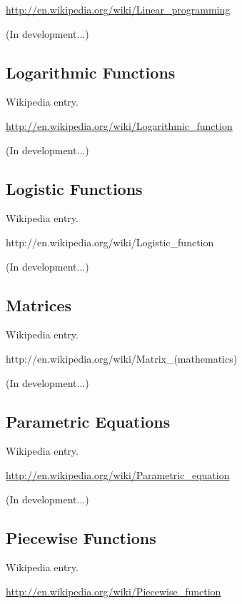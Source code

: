 \documentclass[12pt,twoside]{book}
\begin{document}
\href{http://en.wikipedia.org/wiki/Linear_programming}{http://en.wikipedia.org/wiki/Linear\_programming}

(In development...)

\subsection[Logarithmic Functions]{Logarithmic Functions}

Wikipedia entry.

\href{http://en.wikipedia.org/wiki/Logarithmic_function}{http://en.wikipedia.org/wiki/Logarithmic\_function}

(In development...)

\subsection[Logistic Functions]{Logistic Functions}

Wikipedia entry.

http://en.wikipedia.org/wiki/Logistic\_function

(In development...)

\subsection[Matrices]{Matrices}

Wikipedia entry.

http://en.wikipedia.org/wiki/Matrix\_(mathematics)

(In development...)

\subsection[Parametric Equations]{Parametric Equations}

Wikipedia entry.

\href{http://en.wikipedia.org/wiki/Parametric_equation}{http://en.wikipedia.org/wiki/Parametric\_equation}

(In development...)

\subsection[Piecewise Functions]{Piecewise Functions}

Wikipedia entry.

\href{http://en.wikipedia.org/wiki/Piecewise_function}{http://en.wikipedia.org/wiki/Piecewise\_function}
\end{document}
